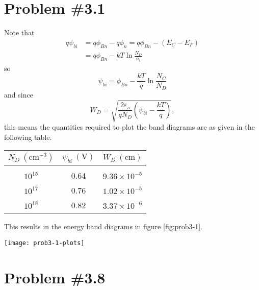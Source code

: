 \documentclass{article}
\begin{document}
\section*{Problem \#3.1}
Note that
\begin{align*}
q \psi_{bi} &= q \phi_{Bn} - q \phi_n = q \phi_{Bn} - (E_C - E_F) \\
            &= q \phi_{Bn} - kT \ln\frac{N_D}{n_i} 
\end{align*}
so
$$
\psi_{bi} = \phi_{Bn} - \frac{kT}{q} \ln\frac{N_C}{N_D}
$$
and since
$$
W_D = \sqrt{\frac{2 \varepsilon_s}{q N_D} 
            \left(\psi_{bi} - \frac{kT}{q}\right)},
$$
this means the quantities required to plot the band diagrams are as given in 
the following table.
                              
\begin{tabular}{c | c c}
$N_D ~(\mathrm{cm}^{-3})$ & $\psi_{bi} ~(\mathrm{V})$ & $W_D ~(\mathrm{cm})$ \\
\hline \\
$10^{15}$ & 0.64 & $9.36 \times 10^{-5}$ \\
$10^{17}$ & 0.76 & $1.02 \times 10^{-5}$ \\
$10^{18}$ & 0.82 & $3.37 \times 10^{-6}$
\end{tabular}

This results in the energy band diagrams in figure \ref{fig:prob3-1}.

\begin{sidewaysfigure}
  \centering
  \texttt{[image: prob3-1-plots]}
  \caption{Energy band diagrams for problem \#3.1. \label{fig:prob3-1}}
\end{sidewaysfigure}

\section*{Problem \#3.8}
\end{document}
